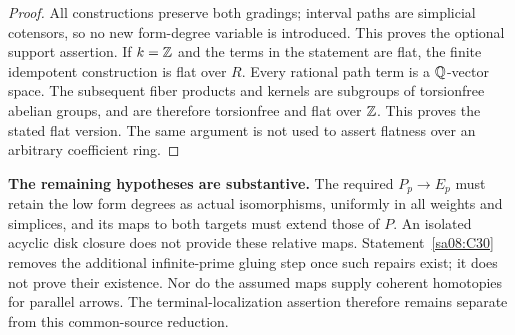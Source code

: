\begin{proof}
All constructions preserve both gradings; interval paths
are simplicial cotensors, so no new form-degree variable
is introduced. This proves the optional support assertion.
If $k=\mathbb Z$ and the terms in the statement are flat, the
finite idempotent construction is flat over $R$. Every
rational path term is a $\mathbb Q$-vector space. The subsequent
fiber products and kernels are subgroups of torsionfree
abelian groups, and are therefore torsionfree and flat
over $\mathbb Z$. This proves the stated flat version. The same
argument is not used to assert flatness over an arbitrary
coefficient ring.
\end{proof}

\par\medskip\noindent\textbf{The remaining hypotheses are substantive.}
The required $P_p\to E_p$ must retain the low form degrees
as actual isomorphisms, uniformly in all weights and
simplices, and its maps to both targets must extend those
of $P$. An isolated acyclic disk closure does not provide
these relative maps. Statement~\ref{sa08:C30} removes the
additional infinite-prime gluing step once such repairs
exist; it does not prove their existence. Nor do the
assumed maps supply coherent homotopies for parallel
arrows. The terminal-localization assertion therefore
remains separate from this common-source reduction.
